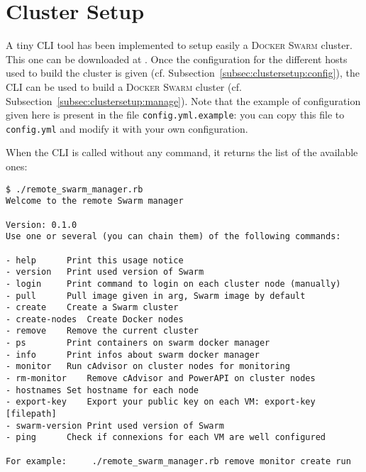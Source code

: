 
\section{Cluster Setup}
\label{sec:clustersetup}

A tiny CLI tool has been implemented to setup easily a \textsc{Docker Swarm} cluster.
This one can be downloaded at \remoteswarmmanagerrepo{}.
Once the configuration for the different hosts used to build the cluster is given (cf. Subsection~\ref{subsec:clustersetup:config}), the CLI can be used to build a \textsc{Docker Swarm} cluster (cf. Subsection~\ref{subsec:clustersetup:manage}).
Note that the example of configuration given here is present in the file \texttt{config.yml.example}: you can copy this file to \texttt{config.yml} and modify it with your own configuration.

When the CLI is called without any command, it returns the list of the available ones:

\begin{lstlisting}[basicstyle=\small]
$ ./remote_swarm_manager.rb
Welcome to the remote Swarm manager

Version: 0.1.0
Use one or several (you can chain them) of the following commands:

- help		Print this usage notice
- version	Print used version of Swarm
- login		Print command to login on each cluster node (manually)
- pull		Pull image given in arg, Swarm image by default
- create	Create a Swarm cluster
- create-nodes	Create Docker nodes
- remove	Remove the current cluster
- ps		Print containers on swarm docker manager
- info		Print infos about swarm docker manager
- monitor	Run cAdvisor on cluster nodes for monitoring
- rm-monitor	Remove cAdvisor and PowerAPI on cluster nodes
- hostnames	Set hostname for each node
- export-key	Export your public key on each VM: export-key [filepath]
- swarm-version	Print used version of Swarm
- ping		Check if connexions for each VM are well configured

For example:	 ./remote_swarm_manager.rb remove monitor create run
\end{lstlisting}






